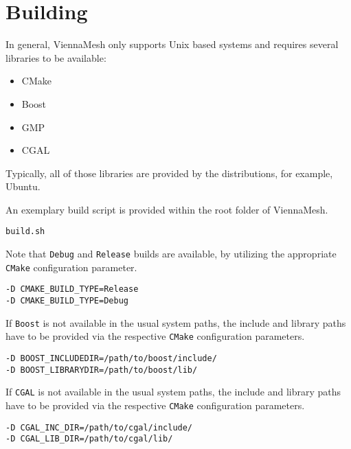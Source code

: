 \section{Building}

In general, ViennaMesh only supports Unix based systems and requires 
several libraries to be available:

\begin{itemize}
   \item CMake~\cite{cmake}
   \item Boost~\cite{boost}
   \item GMP~\cite{gmp}
   \item CGAL~\cite{cgal}
\end{itemize}

Typically, all of those libraries are provided by 
the distributions, for example, Ubuntu. 

An exemplary build script is provided within the root folder of ViennaMesh. 
\begin{exaipd}
\begin{Verbatim}
build.sh
\end{Verbatim}
\end{exaipd}

Note that \texttt{Debug} and \texttt{Release} builds are available, by utilizing 
the appropriate \texttt{CMake} configuration parameter.
\begin{exaipd}
\begin{Verbatim}
-D CMAKE_BUILD_TYPE=Release
-D CMAKE_BUILD_TYPE=Debug
\end{Verbatim}
\end{exaipd}

If \texttt{Boost} is not available in the usual system paths, the include and 
library paths have to be provided via the 
respective \texttt{CMake} configuration parameters.
\begin{exaipd}
\begin{Verbatim}
-D BOOST_INCLUDEDIR=/path/to/boost/include/
-D BOOST_LIBRARYDIR=/path/to/boost/lib/
\end{Verbatim}
\end{exaipd}

If \texttt{CGAL} is not available in the usual system paths, the include and 
library paths have to be provided via the 
respective \texttt{CMake} configuration parameters.
\begin{exaipd}
\begin{Verbatim}
-D CGAL_INC_DIR=/path/to/cgal/include/
-D CGAL_LIB_DIR=/path/to/cgal/lib/
\end{Verbatim}
\end{exaipd}

